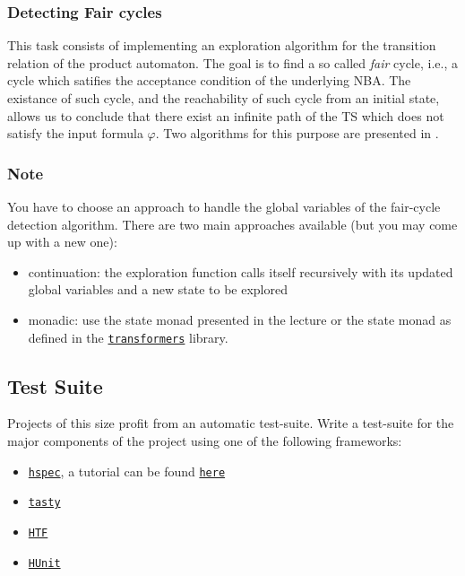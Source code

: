 \documentclass{article}
\begin{document}
\subsubsection*{Detecting Fair cycles}
This task consists of implementing an exploration algorithm for the transition relation of the product 
automaton. The goal is to find a so called \emph{fair} cycle, i.e., a cycle which satifies the acceptance 
condition of the underlying NBA. The existance of such cycle, and the reachability of such cycle from an 
initial state, allows us to conclude that there exist an infinite path of the TS which does not satisfy the input 
formula $\varphi$. Two algorithms for this purpose are presented in \cite[Paragraph 4.4.2]{BaKa}.

\subsubsection*{Note}
You have to choose an approach to handle the global variables of the fair-cycle detection algorithm. 
There are two main approaches available (but you may come up with a new one):
\begin{itemize}
    \item continuation: the exploration function calls itself recursively with its updated global variables 
            and a new state to be explored 
    \item monadic: use the state monad presented in the lecture or the state monad 
            as defined in the \href{https://hackage.haskell.org/package/transformers}{\texttt{transformers}} library.
\end{itemize}

\subsection{Test Suite}
Projects of this size profit from an automatic test-suite. 
Write a test-suite for the major components of the project using one of the following frameworks:

\begin{itemize}
\item \href{https://hackage.haskell.org/package/hspec}{\texttt{hspec}}, a tutorial can be found \href{https://hspec.github.io/}{\texttt{here}}
\item \href{https://hackage.haskell.org/package/tasty}{\texttt{tasty}}
\item \href{https://hackage.haskell.org/package/HTF}{\texttt{HTF}}
\item \href{https://hackage.haskell.org/package/HUnit}{\texttt{HUnit}}
\end{itemize}
\end{document}
